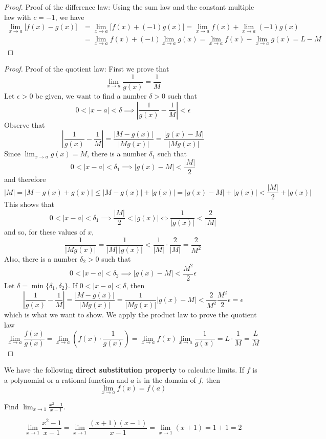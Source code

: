\begin{proof}
    Proof of the difference law:
    Using the sum law and the constant multiple law with \(c=-1\),
    we have
    \begin{align*}
        \lim_{x\to a}\big[f(x)-g(x)\big]
        &= \lim_{x\to a}\big[f(x)+(-1)g(x)\big]
        =\lim_{x\to a}f(x)+\lim_{x\to a}(-1)g(x) \\
        &=\lim_{x\to a}f(x)+(-1)\lim_{x\to a}g(x)
        =\lim_{x\to a}f(x)-\lim_{x\to a}g(x)=L-M
    \end{align*}
\end{proof}
\begin{proof}
    Proof of the quotient law:
    First we prove that \[\lim_{x\to a}\frac{1}{g(x)}=\frac{1}{M}\]
    Let \(\epsilon>0\) be given,
    we want to find a number \(\delta>0\) such that
    \[0<|x-a|<\delta\implies\left|\frac{1}{g(x)}-\frac{1}{M}\right|<\epsilon\]
    Observe that \[\left|\frac{1}{g(x)}-\frac{1}{M}\right|
    =\frac{|M-g(x)|}{|Mg(x)|}=\frac{|g(x)-M|}{|Mg(x)|}\]
    Since \(\displaystyle{\lim_{x\to a}g(x)=M}\),
    there is a number \(\delta_1\) such that
    \[0<|x-a|<\delta_1\implies|g(x)-M|<\frac{|M|}{2}\] and therefore
    \[|M|=|M-g(x)+g(x)|\leq|M-g(x)|+|g(x)|=|g(x)-M|+|g(x)|
    <\frac{|M|}{2}+|g(x)|\]
    This shows that
    \[0<|x-a|<\delta_1\implies\frac{|M|}{2}<|g(x)|\iff\frac{1}{|g(x)|}
    <\frac{2}{|M|}\]
    and so,
    for these values of \(x\),
    \[\frac{1}{|Mg(x)|}=\frac{1}{|M|\,|g(x)|}<\frac{1}{|M|}\cdot\frac{2}{|M|}
    =\frac{2}{M^2}\]
    Also,
    there is a number \(\delta_2>0\) such that
    \[0<|x-a|<\delta_2\implies|g(x)-M|<\frac{M^2}{2}\epsilon\]
    Let \(\delta=\min\{\delta_1,\delta_2\}\).
    If \(0<|x-a|<\delta\),
    then
    \[\left|\frac{1}{g(x)}-\frac{1}{M}\right|=\frac{|M-g(x)|}{|Mg(x)|}
    =\frac{1}{|Mg(x)|}|g(x)-M|<\frac{2}{M^2}\frac{M^2}{2}\epsilon=\epsilon\]
    which is what we want to show.
    We apply the product law to prove the quotient law
    \[\lim_{x\to a}\frac{f(x)}{g(x)}
    =\lim_{x\to a}\left(f(x)\cdot\frac{1}{g(x)}\right)
    =\lim_{x\to a}f(x)\lim_{x\to a}\frac{1}{g(x)}=L\cdot\frac{1}{M}
    =\frac{L}{M}\]
\end{proof}
We have the following \textbf{direct substitution property} to calculate
limits.
If \(f\) is a polynomial or a rational function and \(a\) is in the domain of
\(f\),
then
\[\lim_{x\to a}f(x)=f(a)\]
\begin{problem}
    Find \(\displaystyle{\lim_{x\to 1}\frac{x^2-1}{x-1}}\).
\end{problem}
\begin{solution}
    \[\lim_{x\to 1}\frac{x^2-1}{x-1}
    =\lim_{x\to 1}\frac{(x+1)(x-1)}{x-1}
    =\lim_{x\to 1}(x+1)=1+1=2\]
\end{solution}
